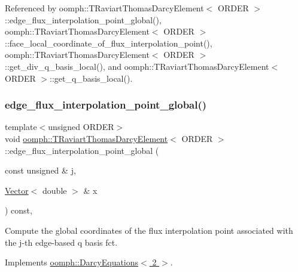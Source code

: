 Referenced by oomph\+::\+T\+Raviart\+Thomas\+Darcy\+Element$<$ O\+R\+D\+E\+R $>$\+::edge\+\_\+flux\+\_\+interpolation\+\_\+point\+\_\+global(), oomph\+::\+T\+Raviart\+Thomas\+Darcy\+Element$<$ O\+R\+D\+E\+R $>$\+::face\+\_\+local\+\_\+coordinate\+\_\+of\+\_\+flux\+\_\+interpolation\+\_\+point(), oomph\+::\+T\+Raviart\+Thomas\+Darcy\+Element$<$ O\+R\+D\+E\+R $>$\+::get\+\_\+div\+\_\+q\+\_\+basis\+\_\+local(), and oomph\+::\+T\+Raviart\+Thomas\+Darcy\+Element$<$ O\+R\+D\+E\+R $>$\+::get\+\_\+q\+\_\+basis\+\_\+local().

\mbox{\label{classoomph_1_1TRaviartThomasDarcyElement_a11c49e611acc0becbf0907766b5e9938}} 
\subsubsection{\texorpdfstring{edge\+\_\+flux\+\_\+interpolation\+\_\+point\+\_\+global()}{edge\_flux\_interpolation\_point\_global()}\hspace{0.1cm}{\footnotesize\ttfamily [1/2]}}
{\footnotesize\ttfamily template$<$unsigned O\+R\+D\+ER$>$ \\
void \hyperlink{classoomph_1_1TRaviartThomasDarcyElement}{oomph\+::\+T\+Raviart\+Thomas\+Darcy\+Element}$<$ O\+R\+D\+ER $>$\+::edge\+\_\+flux\+\_\+interpolation\+\_\+point\+\_\+global (\begin{DoxyParamCaption}\item[{const unsigned \&}]{j,  }\item[{\hyperlink{classoomph_1_1Vector}{Vector}$<$ double $>$ \&}]{x }\end{DoxyParamCaption}) const\hspace{0.3cm}{\ttfamily [inline]}, {\ttfamily [virtual]}}



Compute the global coordinates of the flux interpolation point associated with the j-\/th edge-\/based q basis fct. 



Implements \hyperlink{classoomph_1_1DarcyEquations_a250719cbe94e97c88996b5b4f5553649}{oomph\+::\+Darcy\+Equations$<$ 2 $>$}.



